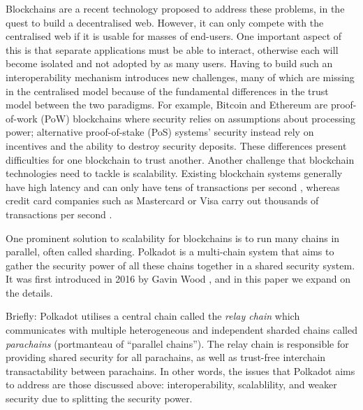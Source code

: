 Blockchains are a recent technology proposed to address these problems, in the quest to build a decentralised web. However, it can only compete with the centralised web if it is usable for masses of end-users. One important aspect of this is that separate applications must be able to interact, otherwise each will become isolated and not adopted by as many users. Having to build such an interoperability mechanism introduces new challenges, many of which are missing in the centralised model because of the fundamental differences in the trust model between the two paradigms.
For example, Bitcoin\cite{nakamoto2008bitcoin} and Ethereum\cite{buterin2014ethereum} are proof-of-work (PoW) blockchains where security relies on assumptions about processing power; alternative proof-of-stake (PoS) systems' security instead rely on incentives and the ability to destroy security deposits. These differences present difficulties for one blockchain to trust another. Another challenge that blockchain technologies need to tackle is scalability. Existing blockchain systems generally have high latency and can only have tens of transactions per second \cite{scaling}, whereas credit card companies such as Mastercard or Visa carry out thousands of transactions per second \cite{Visa2020}.

One prominent solution to scalability for blockchains is to run many chains in parallel, often called sharding. %
Polkadot is a multi-chain system that aims to gather the security power of all these chains together in a shared security system. It was first introduced in 2016 by Gavin Wood \cite{2016:Wood:Polkadot}, and in this paper we expand on the details.

Briefly: Polkadot utilises a central chain called the \emph{relay chain} which communicates with multiple heterogeneous and independent sharded chains called \emph{parachains} (portmanteau of “parallel chains”). The relay chain is responsible for providing shared security for all parachains, as well as trust-free interchain transactability between parachains. In other words, the issues that Polkadot aims to address are those discussed above: interoperability, scalablility, and weaker security due to splitting the security power.



